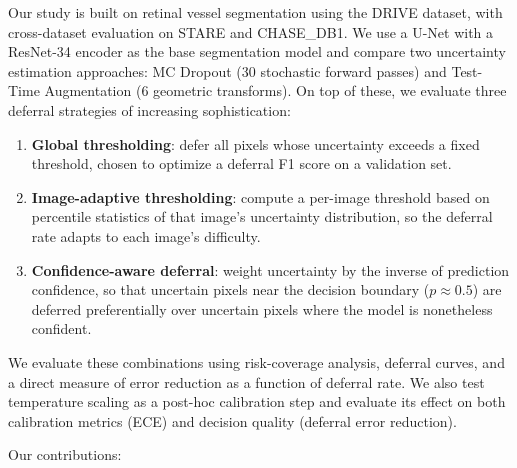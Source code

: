 Our study is built on retinal vessel segmentation using the DRIVE dataset, with
cross-dataset evaluation on STARE and CHASE\_DB1. We use a U-Net with a
ResNet-34 encoder as the base segmentation model and compare two uncertainty
estimation approaches: MC Dropout (30 stochastic forward passes) and Test-Time
Augmentation (6 geometric transforms). On top of these, we evaluate three
deferral strategies of increasing sophistication:

\begin{enumerate}[leftmargin=*]
  \item \textbf{Global thresholding}: defer all pixels whose uncertainty exceeds
  a fixed threshold, chosen to optimize a deferral F1 score on a validation set.
  \item \textbf{Image-adaptive thresholding}: compute a per-image threshold
  based on percentile statistics of that image's uncertainty distribution, so
  the deferral rate adapts to each image's difficulty.
  \item \textbf{Confidence-aware deferral}: weight uncertainty by the inverse of
  prediction confidence, so that uncertain pixels near the decision boundary
  ($p \approx 0.5$) are deferred preferentially over uncertain pixels where the
  model is nonetheless confident.
\end{enumerate}

We evaluate these combinations using risk-coverage analysis, deferral curves,
and a direct measure of error reduction as a function of deferral rate. We also
test temperature scaling as a post-hoc calibration step and evaluate its effect
on both calibration metrics (ECE) and decision quality (deferral error
reduction).

Our contributions:

